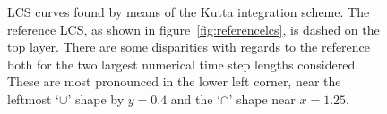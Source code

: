 \begin{figure}[htpb]
    \centering
    
    \caption[LCS curves found by means of the Kutta integration scheme]{
        LCS curves found by means of the Kutta integration scheme. The
        reference LCS, as shown in figure~\ref{fig:referencelcs},
        is dashed on the top layer. There are some disparities with
        regards to the reference both for the two largest numerical
        time step lengths considered. These are most pronounced in the lower
        left corner, near the leftmost `$\cup$' shape by $y=0.4$ and the
        `$\cap$' shape near $x=1.25$.}
    \label{fig:lcs_rk3}
\end{figure}
